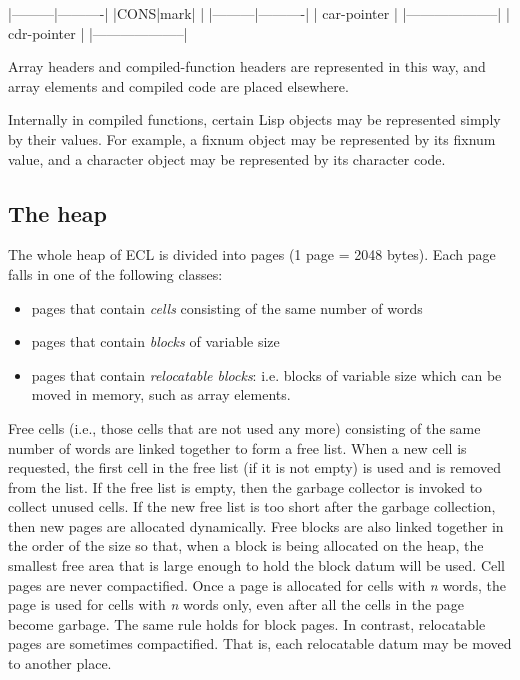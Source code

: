 \begin{example}
             
                |---------|----------| 
                |CONS|mark|          |
                |---------|----------| 
                |     car-pointer    |
                |--------------------| 
                |     cdr-pointer    |
                |--------------------| 
\end{example}

Array headers and compiled-function headers are represented
in this way, and array elements and compiled code are placed
elsewhere.

Internally in compiled functions, certain Lisp objects may
be represented simply by their values.  For example, a fixnum object
may be represented by its fixnum value, and a character object may be
represented by its character code.

\subsection{The heap}

The whole heap of ECL is divided into pages (1 page = 2048
bytes).  Each page falls in one of the following classes:

\begin{itemize}
\item pages that contain {\em cells} consisting of the same number of words
\item pages that contain {\em blocks} of variable size
\item pages that contain {\em relocatable blocks}: i.e. blocks of variable size
which can be moved in memory, such as array elements.
\end{itemize}

Free cells (i.e., those cells that are not used any more) consisting
of the same number of words are linked together to form a free list.
When a new cell is requested, the first cell in the free list (if it
is not empty) is used and is removed from the list.  If the free list
is empty, then the garbage collector is invoked to collect unused
cells.  If the new free list is too short after the garbage
collection, then new pages are allocated dynamically.  Free blocks are
also linked together in the order of the size so that, when a block is
being allocated on the heap, the smallest free area that is large
enough to hold the block datum will be used.  Cell pages are never
compactified.  Once a page is allocated for cells with {\em n} words,
the page is used for cells with {\em n} words only, even after all the
cells in the page become garbage.  The same rule holds for block
pages.  In contrast, relocatable pages are sometimes compactified.
That is, each relocatable datum may be moved to another place.

